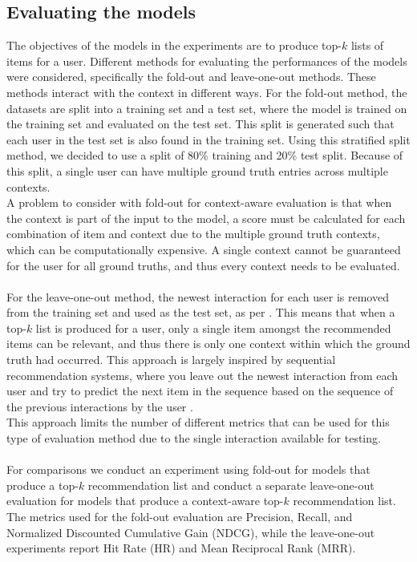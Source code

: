 \subsection{Evaluating the models}\label{subsec:evalandmetrics}
The objectives of the models in the experiments are to produce top-$k$ lists of items for a user. 
Different methods for evaluating the performances of the models were considered, specifically the fold-out and leave-one-out methods.
These methods interact with the context in different ways.
For the fold-out method, the datasets are split into a training set and a test set, where the model is trained on the training set and evaluated on the test set. 
This split is generated such that each user in the test set is also found in the training set.
Using this stratified split method, we decided to use a split of 80\% training and 20\% test split.
Because of this split, a single user can have multiple ground truth entries across multiple contexts.\\
A problem to consider with fold-out for context-aware evaluation is that when the context is part of the input to the model, a score must be calculated for each combination of item and context due to the multiple ground truth contexts, which can be computationally expensive.
A single context cannot be guaranteed for the user for all ground truths, and thus every context needs to be evaluated.
\\\\
For the leave-one-out method, the newest interaction for each user is removed from the training set and used as the test set, as per \cite{CFM, BPR}.
This means that when a top-$k$ list is produced for a user, only a single item amongst the recommended items can be relevant, and thus there is only one context within which the ground truth had occurred.
This approach is largely inspired by sequential recommendation systems, where you leave out the newest interaction from each user and try to predict the next item in the sequence based on the sequence of the previous interactions by the user \cite{aggarwal2016recommender}.\\
This approach limits the number of different metrics that can be used for this type of evaluation method due to the single interaction available for testing.
\\\\
For comparisons we conduct an experiment using fold-out for models that produce a top-$k$ recommendation list and conduct a separate leave-one-out evaluation for models that produce a context-aware top-$k$ recommendation list. 
The metrics used for the fold-out evaluation are Precision, Recall, and Normalized Discounted Cumulative Gain (NDCG), while the leave-one-out experiments report Hit Rate (HR) and Mean Reciprocal Rank (MRR).

